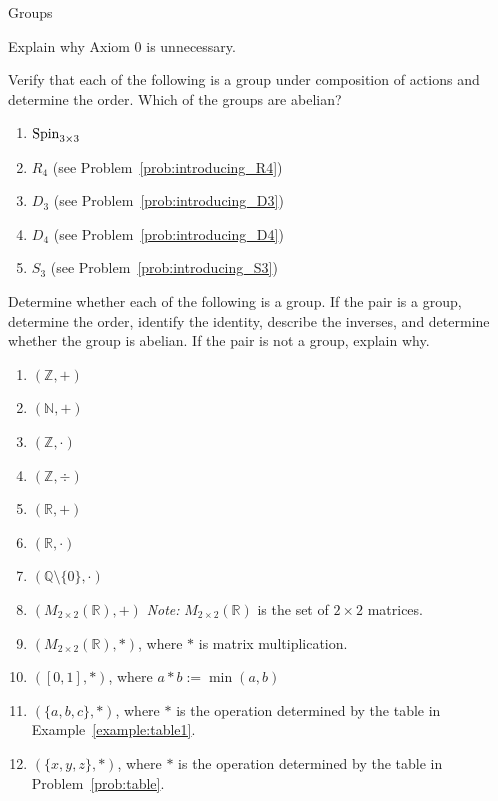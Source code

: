 \begin{section}{Groups}
\begin{problem}
Explain why Axiom 0 is unnecessary.
\end{problem}

\begin{problem}
Verify that each of the following is a group under composition of actions and determine the order. Which of the groups are abelian?
\begin{enumerate}[label=\textrm{(\alph*)}]
\item $\operatorname{Spin}_{3\times 3}$
\item $R_4$ (see Problem~\ref{prob:introducing_R4})
\item $D_3$ (see Problem~\ref{prob:introducing_D3})
\item $D_4$ (see Problem~\ref{prob:introducing_D4})
\item $S_3$ (see Problem~\ref{prob:introducing_S3})
\end{enumerate}
\end{problem}

\begin{problem}
Determine whether each of the following is a group.  If the pair is a group, determine the order, identify the identity, describe the inverses, and determine whether the group is abelian. If the pair is not a group, explain why.
\begin{enumerate}[label=\textrm{(\alph*)}]
\item $(\mathbb{Z},+)$
\item $(\mathbb{N},+)$
\item $(\mathbb{Z},\cdot)$
\item $(\mathbb{Z},\div)$
\item $(\mathbb{R},+)$
\item $(\mathbb{R},\cdot)$
\item $(\mathbb{Q}\setminus \{0\},\cdot)$
\item $(M_{2\times 2}(\mathbb{R}),+)$ \quad \emph{Note:} $M_{2\times 2}(\mathbb{R})$ is the set of $2\times 2$ matrices.
\item $(M_{2\times 2}(\mathbb{R}),*)$, where $*$ is matrix multiplication.
\item $([0,1],*)$, where $a*b:=\min(a,b)$
\item $(\{a,b,c\},*)$, where $*$ is the operation determined by the table in Example~\ref{example:table1}.
\item $(\{x,y,z\},*)$, where $*$ is the operation determined by the table in Problem~\ref{prob:table}.
\end{enumerate}
\end{problem}


\end{section}
